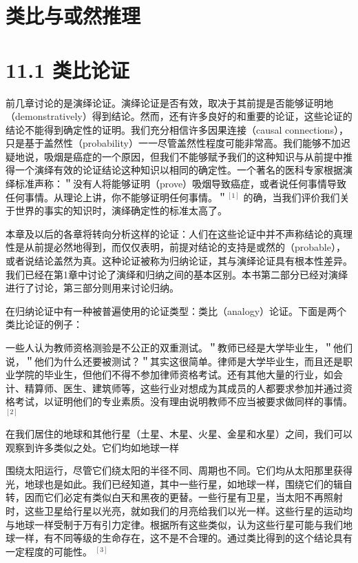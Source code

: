\section*{类比与或然推理}


\section*{11.1 类比论证}
前几章讨论的是演绎论证。演绎论证是否有效，取决于其前提是否能够证明地（demonstratively）得到结论。然而，还有许多良好的和重要的论证，这些论证的结论不能得到确定性的证明。我们充分相信许多因果连接（causal connections），只是基于盖然性（probability）一一尽管盖然性程度可能非常高。我们能够不加迟疑地说，吸烟是癌症的一个原因，但我们不能够赋予我们的这种知识与从前提中推得一个演绎有效的论证结论这种知识以相同的确定性。一个著名的医科专家根据演绎标准声称：＂没有人将能够证明（prove）吸烟导致癌症，或者说任何事情导致任何事情。从理论上讲，你不能够证明任何事情。＂${ }^{[1]}$ 的确，当我们评价我们关于世界的事实的知识时，演绎确定性的标准太高了。

本章及以后的各章将转向分析这样的论证：人们在这些论证中并不声称结论的真理性是从前提必然地得到，而仅仅表明，前提对结论的支持是或然的（probable），或者说结论盖然为真。这种论证被称为归纳论证，其与演绎论证具有根本性差异。我们已经在第1章中讨论了演绎和归纳之间的基本区别。本书第二部分已经对演绎进行了讨论，第三部分则用来讨论归纳。

在归纳论证中有一种被普遍使用的论证类型：类比（analogy）论证。下面是两个类比论证的例子：

一些人认为教师资格测验是不公正的双重测试。＂教师已经是大学毕业生，＂他们说，＂他们为什么还要被测试？＂其实这很简单。律师是大学毕业生，而且还是职业学院的毕业生，但他们不得不参加律师资格考试。还有其他大量的行业，如会计、精算师、医生、建筑师等，这些行业对想成为其成员的人都要求参加并通过资格考试，以证明他们的专业素质。没有理由说明教师不应当被要求做同样的事情。 ${ }^{[2]}$

在我们居住的地球和其他行星（土星、木星、火星、金星和水星）之间，我们可以观察到许多类似之处。它们均如地球一样

围绕太阳运行，尽管它们绕太阳的半径不同、周期也不同。它们均从太阳那里获得光，地球也是如此。我们已经知道，其中一些行星，如地球一样，围绕它们的辑自转，因而它们必定有类似白天和黑夜的更替。一些行星有卫星，当太阳不再照射时，这些卫星给行星以光亮，就如我们的月亮给我们以光一样。这些行星的运动均与地球一样受制于万有引力定律。根据所有这些类似，认为这些行星可能与我们地球一样，有不同等级的生命存在，这不是不合理的。通过类比得到的这个结论具有一定程度的可能性。 ${ }^{[3]}$

